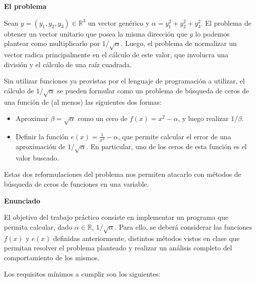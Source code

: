 \textbf{El problema}

Sean $y = (y_1, y_2, y_3) \in \mathbb{R}^3$ un vector gen\'erico y $\alpha = y_1^2 + y_2^2 + y_3^2$. El problema de
obtener un vector unitario que posea la misma direcci\'on que $y$ lo podemos plantear como multiplicarlo por
$1/\sqrt{\alpha}$. Luego, el problema de normalizar un vector radica principalmente en el c\'alculo de este valor, que
involucra una divisi\'on y el c\'alculo de una ra\'iz cuadrada. 

Sin utilizar funciones ya provistas por el lenguaje de programaci\'on a utilizar, el c\'alculo de $1/\sqrt{\alpha}$ se
pueden formular como un problema de b\'usqueda de ceros de una funci\'on de (al menos) las siguientes dos formas:
\begin{itemize}
\item Aproximar $\beta = \sqrt{\alpha}$ como un cero de $f(x) = x^2 - \alpha$, y luego realizar $1/\beta$. 
\item Definir la funci\'on $e(x) = \frac{1}{x^2} - \alpha$, que permite calcular el error de una aproximaci\'on de
$1/\sqrt{\alpha}$. En particular, uno de los ceros de esta funci\'on es el valor buscado.
\end{itemize}

Estas dos reformulaciones del problema nos permiten atacarlo con m\'etodos de b\'usqueda de ceros de funciones en una
variable.

\textbf{Enunciado}

El objetivo del trabajo pr\'actico consiste en implementar un programa que permita calcular, dado $\alpha \in
\mathbb{R}$, $1/\sqrt{\alpha}$. Para ello, se deber\'a considerar las funciones $f(x)$ y $e(x)$ definidas
anteriormente, distintos m\'etodos vistos en clase que permitan resolver el problema planteado y realizar un an\'alisis
completo del comportamiento de los mismos. 

Los requisitos m\'inimos a cumplir son los siguientes:

